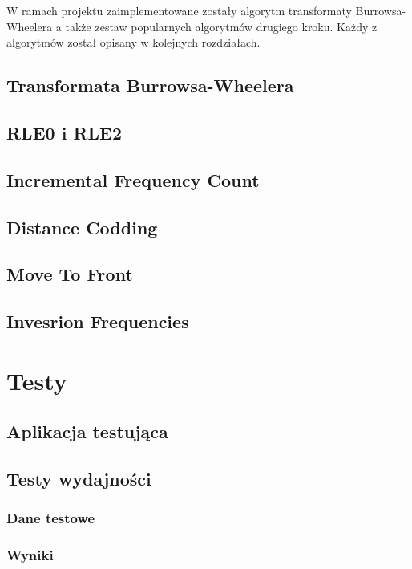 \documentclass[a4paper,12pt]{article}
\begin{document}
W ramach projektu zaimplementowane zostały algorytm transformaty Burrowsa-Wheelera a także zestaw popularnych algorytmów drugiego kroku. Każdy z algorytmów został opisany w kolejnych rozdziałach.

\subsection{Transformata Burrowsa-Wheelera}
\label{ch:BWT}


\subsection{RLE0 i RLE2}
\label{ch:rle}


\subsection{Incremental Frequency Count}
\label{ch:ifc}


\subsection{Distance Codding}
\label{ch:dc}


\subsection{Move To Front}
\label{ch:mtf}


\subsection{Invesrion Frequencies}
\label{ch:if}


\section{Testy}

\subsection{Aplikacja testująca}
\label{ch:app_test}


\subsection{Testy wydajności}

\subsubsection{Dane testowe}


\subsubsection{Wyniki}




\clearpage

{}

\end{document}
